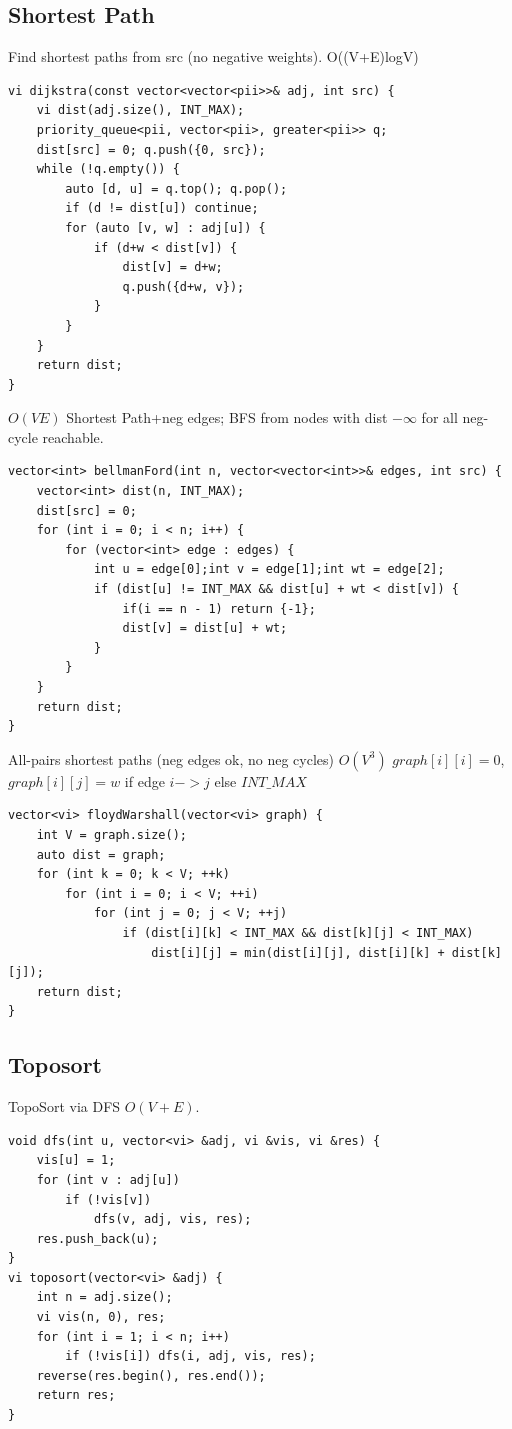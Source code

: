 \documentclass[10pt,a4paper]{article}
\begin{document}
\subsection{Shortest Path}

Find shortest paths from src (no negative weights). O((V+E)logV)
\begin{verbatim}
vi dijkstra(const vector<vector<pii>>& adj, int src) {
    vi dist(adj.size(), INT_MAX);
    priority_queue<pii, vector<pii>, greater<pii>> q;
    dist[src] = 0; q.push({0, src});
    while (!q.empty()) {
        auto [d, u] = q.top(); q.pop();
        if (d != dist[u]) continue;
        for (auto [v, w] : adj[u]) {
            if (d+w < dist[v]) {
                dist[v] = d+w;
                q.push({d+w, v});
            }
        }
    }
    return dist;
}
\end{verbatim}
$O(VE)$ Shortest Path+neg edges; BFS from nodes with dist $-\infty$ for all neg-cycle reachable.
\begin{verbatim}
vector<int> bellmanFord(int n, vector<vector<int>>& edges, int src) {
	vector<int> dist(n, INT_MAX);
	dist[src] = 0;
	for (int i = 0; i < n; i++) {
		for (vector<int> edge : edges) {
			int u = edge[0];int v = edge[1];int wt = edge[2];
			if (dist[u] != INT_MAX && dist[u] + wt < dist[v]) {
                if(i == n - 1) return {-1};
                dist[v] = dist[u] + wt;
            }
		}
	}
    return dist;
}
\end{verbatim}
All-pairs shortest paths (neg edges ok, no neg cycles) $O(V^3)$
$graph[i][i]=0$, $graph[i][j]=w$ if edge $i->j$ else $INT\_MAX$
\begin{verbatim}
vector<vi> floydWarshall(vector<vi> graph) {
    int V = graph.size();
    auto dist = graph;
    for (int k = 0; k < V; ++k)
        for (int i = 0; i < V; ++i)
            for (int j = 0; j < V; ++j)
                if (dist[i][k] < INT_MAX && dist[k][j] < INT_MAX)
                    dist[i][j] = min(dist[i][j], dist[i][k] + dist[k][j]);
    return dist;
}
\end{verbatim}

\subsection{Toposort}

TopoSort via DFS $O(V+E)$.
\begin{verbatim}
void dfs(int u, vector<vi> &adj, vi &vis, vi &res) {
    vis[u] = 1;
    for (int v : adj[u])
        if (!vis[v])
            dfs(v, adj, vis, res);
    res.push_back(u);
}
vi toposort(vector<vi> &adj) {
    int n = adj.size();
    vi vis(n, 0), res;
    for (int i = 1; i < n; i++)
        if (!vis[i]) dfs(i, adj, vis, res);
    reverse(res.begin(), res.end());
    return res;
}
\end{verbatim}
\end{document}
